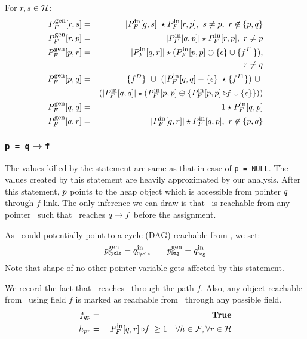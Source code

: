 For  $r, s  \in
\mathcal{H}$:
\begin{eqnarray*}
  P_F^{\mbox{\footnotesize gen}}[r, s] &=& |P_F^{\mbox{\footnotesize in}}[q, s]| \star
  P_F^{\mbox{\footnotesize in}}[r, p],\ s \not= p,\ r \not\in
  \{p, q\}\\ 
  P_F^{\mbox{\footnotesize gen}}[r, p] &=& |P_F^{\mbox{\footnotesize in}}[q,p]| \star
  P_F^{\mbox{\footnotesize in}}[r, p], \ r \not= p\\
 P_F^{\mbox{\footnotesize gen}}[p, r] &=& |P_F^{\mbox{\footnotesize in}}[q, r]| \star
 (P_F^{\mbox{\footnotesize in}}[p, p] \ominus \{\epsilon\} \cup \{f^{I
   1}\}),\\ 
   && \qquad \qquad r \not= q \\ 
  P_F^{\mbox{\footnotesize gen}}[p, q] &=&
  \{{f}_{}^{D}\}\ \cup\ (|P_F^{\mbox{\footnotesize in}}[q, q] -
    \{\epsilon\}| \star
  \{{f}_{}^{I1}\})\ \cup\ \\
  && (|P_F^{\mbox{\footnotesize in}}[q, q]| \star ( P_F^{\mbox{\footnotesize in}}[p, p] \ominus \{P_F^{\mbox{\footnotesize in}}[p,p]\triangleright\!\!f \cup \{\epsilon\} \})) \\ 
  P_F^{\mbox{\footnotesize gen}}[q, q] &=& 1 \star P_F^{\mbox{\footnotesize in}}[q, p] \\
  P_F^{\mbox{\footnotesize gen}}[q, r] &=& |P_F^{\mbox{\footnotesize in}}[q, r]| \star
  P_F^{\mbox{\footnotesize in}}[q, p],\ r \not\in \{p,
  q\} \\ 
\end{eqnarray*}

\subsubsection {\tt p = q$\rightarrow$f} 
The values killed by  the statement are  same as  that in
case  of {\tt  p  =  NULL}.  The  values  created by  this
statement  are heavily approximated  by our  analysis.  After
this  statement, $p$  points  to the  heap  object which  is
accessible  from  pointer $q$  through  $f$  link. The  only
inference  we can  draw is  that  \p\ is  reachable from  any
pointer  \myr\  such  that  \myr\ reaches  $q\rightarrow  f$
before  the  assignment.   

As \p\ could potentially point to a cycle (DAG) reachable from
\q, we set:
\[\GenC{p} = \InC{q} \qquad \GenD{p} = \InD{q}\]
Note that shape of no other pointer variable gets affected by
this statement.

We  record the  fact that  \q\ reaches  \p\ through  the path
$f$. Also, any  object reachable from \q\ using  field $f$ is
marked as reachable from \p\ through any possible field.
\begin{eqnarray*}
  f_{\q\p} &=& \true \\ %
  {h_{\p\myr}} &=&
  \num{\project{P_F^{\din}[\q,\myr]}{f}} \geq 1\quad
  \forall h \in \fields, \forall \myr \in \heap 
\end{eqnarray*}

